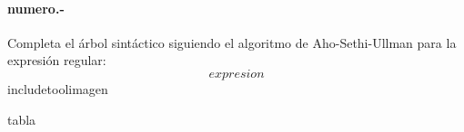 

\paragraph{{numero}.-}\label{p{numero}}
Completa el árbol sintáctico siguiendo el algoritmo de Aho-Sethi-Ullman para la expresión regular:
\[
    {expresion}
\]
    {includetool}{{imagen}}
    
{tabla}
